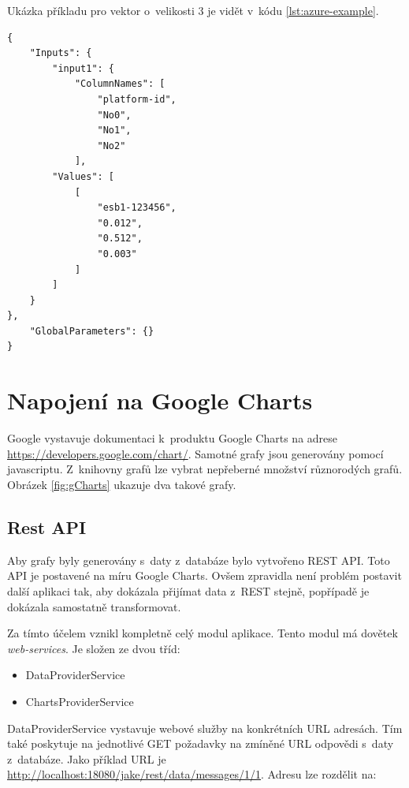 \documentclass[thesis=M,czech]{FITthesis}[2012/10/20]
\begin{document}
		Ukázka příkladu pro vektor o~velikosti 3 je vidět v~kódu \ref{lst:azure-example}.
		
		
			\begin{lstlisting}[caption={Požadavek na webovou službu Azure ML}, label={lst:azure-example}]
{
	"Inputs": {
		"input1": {
			"ColumnNames": [
				"platform-id",
				"No0",
				"No1",
				"No2"
			],
		"Values": [
			[
				"esb1-123456",
				"0.012",
				"0.512",
				"0.003"
			]
		]
	}
},
	"GlobalParameters": {}
}
			\end{lstlisting}
	
					

		
	\section{Napojení na Google Charts}
		Google vystavuje dokumentaci k~produktu Google Charts na adrese \url{https://developers.google.com/chart/}. Samotné grafy jsou generovány pomocí javascriptu. Z~knihovny grafů lze vybrat nepřeberné množství různorodých grafů. Obrázek \ref{fig:gCharts} ukazuje dva takové grafy.
		
		\subsection{Rest API}
			Aby grafy byly generovány s~daty z~databáze bylo vytvořeno REST API. Toto API je postavené na míru Google Charts. Ovšem zpravidla není problém postavit další aplikaci tak, aby dokázala přijímat data z~REST stejně, popřípadě je dokázala samostatně transformovat.
		
			Za tímto účelem vznikl kompletně celý modul aplikace. Tento modul má dovětek \textit{web-services}. Je složen ze dvou tříd:
		
		\begin{itemize} 
			\item DataProviderService
			\item ChartsProviderService			
		\end{itemize}
		
		DataProviderService vystavuje webové služby na konkrétních URL adresách. Tím také poskytuje na jednotlivé GET požadavky na zmíněné URL odpovědi s~daty z~databáze. Jako příklad URL je \url{http://localhost:18080/jake/rest/data/messages/1/1}. Adresu lze rozdělit na:
		
\end{document}
